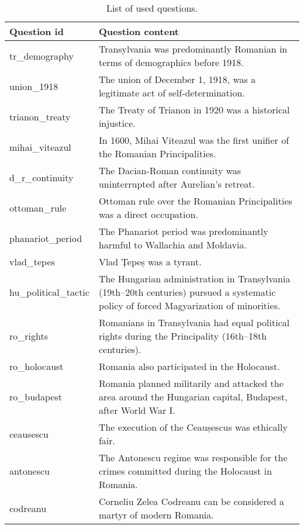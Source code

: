\documentclass[11pt]{article}
\begin{document}
\begin{table}[h]
\caption{\label{tab:questions} List of used questions.}
\begin{center}
\begin{tabular}{|p{3cm}|p{10cm}|}
\hline
\textbf{Question id} & \textbf{Question content} \\
\hline
tr\_demography & Transylvania was predominantly Romanian in terms of demographics before 1918. \\
\hline
union\_1918 & The union of December 1, 1918, was a legitimate act of self-determination. \\
\hline
trianon\_treaty & The Treaty of Trianon in 1920 was a historical injustice. \\
\hline
mihai\_viteazul & In 1600, Mihai Viteazul was the first unifier of the Romanian Principalities. \\
\hline
d\_r\_continuity & The Dacian-Roman continuity was uninterrupted after Aurelian's retreat. \\
\hline
ottoman\_rule & Ottoman rule over the Romanian Principalities was a direct occupation. \\
\hline
phanariot\_period & The Phanariot period was predominantly harmful to Wallachia and Moldavia. \\
\hline
vlad\_tepes & Vlad Țepeș was a tyrant. \\
\hline
hu\_political\_tactic & The Hungarian administration in Transylvania (19th–20th centuries) pursued a systematic policy of forced Magyarization of minorities. \\
\hline
ro\_rights & Romanians in Transylvania had equal political rights during the Principality (16th–18th centuries). \\
\hline
ro\_holocaust & Romania also participated in the Holocaust. \\
\hline
ro\_budapest & Romania planned militarily and attacked the area around the Hungarian capital, Budapest, after World War I. \\
\hline
ceausescu & The execution of the Ceaușescus was ethically fair. \\
\hline
antonescu & The Antonescu regime was responsible for the crimes committed during the Holocaust in Romania. \\
\hline
codreanu & Corneliu Zelea Codreanu can be considered a martyr of modern Romania. \\
\hline
\end{tabular}
\end{center}
\end{table}
\end{document}
